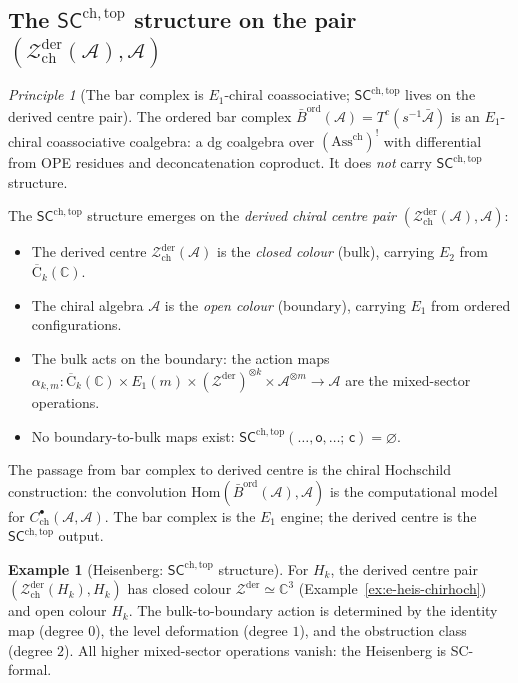 \documentclass[11pt,reqno]{amsart}
\theoremstyle{definition}
\newtheorem{example}[theorem]{Example}
\theoremstyle{remark}
\newtheorem{principle}[theorem]{Principle}
\providecommand{\cA}{\mathcal{A}}
\providecommand{\cZ}{\mathcal{Z}}
\providecommand{\FM}{\overline{\mathrm{C}}}
\providecommand{\Eone}{E_1}
\providecommand{\Etwo}{E_2}
\providecommand{\SCchtop}{\ensuremath{\mathsf{SC}^{\mathrm{ch,top}}}}
\providecommand{\Barord}{\bar{B}^{\mathrm{ord}}}
\providecommand{\bC}{\mathbb{C}}
\providecommand{\Hom}{\mathrm{Hom}}
\providecommand{\chirAss}{\mathrm{Ass}^{\mathrm{ch}}}
\begin{document}
\subsection{The $\SCchtop$ structure on the pair
$(\cZ^{\mathrm{der}}_{\mathrm{ch}}(\cA), \cA)$}

\begin{principle}[The bar complex is $\Eone$-chiral coassociative;
$\SCchtop$ lives on the derived centre pair]
\label{princ:e-sc-location}
The ordered bar complex
$\Barord(\cA) = T^c(s^{-1}\bar{\cA})$ is an
$\Eone$-chiral coassociative coalgebra: a dg coalgebra over
$(\chirAss)^!$ with differential from OPE residues and
deconcatenation coproduct. It does \emph{not} carry $\SCchtop$
structure.

The $\SCchtop$ structure emerges on the \emph{derived chiral
centre pair}
$(\cZ^{\mathrm{der}}_{\mathrm{ch}}(\cA), \cA)$:
\begin{itemize}
\item The derived centre
 $\cZ^{\mathrm{der}}_{\mathrm{ch}}(\cA)$ is the
 \emph{closed colour} (bulk), carrying $\Etwo$ from
 $\FM_k(\bC)$.
\item The chiral algebra $\cA$ is the \emph{open colour}
 (boundary), carrying $\Eone$ from ordered configurations.
\item The bulk acts on the boundary: the action maps
 $\alpha_{k,m}\colon
 \FM_k(\bC) \times \Eone(m) \times
 (\cZ^{\mathrm{der}})^{\otimes k} \times \cA^{\otimes m}
 \to \cA$ are the mixed-sector operations.
\item No boundary-to-bulk maps exist:
 $\SCchtop(\ldots,\mathsf{o},\ldots;\,\mathsf{c})
 = \varnothing$.
\end{itemize}
The passage from bar complex to derived centre is the
chiral Hochschild construction: the convolution
$\Hom(\Barord(\cA), \cA)$ is the computational model for
$C^\bullet_{\mathrm{ch}}(\cA, \cA)$. The bar complex is the
$\Eone$ engine; the derived centre is the $\SCchtop$ output.
\end{principle}

\begin{example}[Heisenberg: $\SCchtop$ structure]
\label{ex:e-heis-sc}
For $H_k$, the derived centre pair
$(\cZ^{\mathrm{der}}_{\mathrm{ch}}(H_k), H_k)$ has closed
colour $\cZ^{\mathrm{der}} \simeq \bC^3$
(Example~\ref{ex:e-heis-chirhoch}) and open colour
$H_k$. The bulk-to-boundary action is determined by the
identity map (degree $0$), the level deformation (degree $1$),
and the obstruction class (degree $2$). All higher mixed-sector
operations vanish: the Heisenberg is SC-formal.
\end{example}
\end{document}
